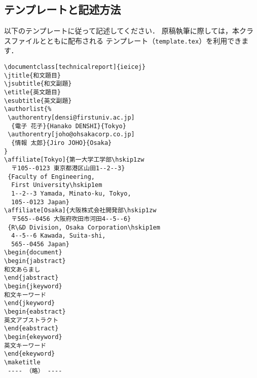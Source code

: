 \documentclass[technicalreport]{ieicej}
\begin{document}
\subsection{テンプレートと記述方法}
\label{sec:technicalreport}

以下のテンプレートに従って記述してください．
原稿執筆に際しては，本クラスファイルとともに配布される
テンプレート（\texttt{template.tex}）を利用できます．

\begin{verbatim}
\documentclass[technicalreport]{ieicej}
\jtitle{和文題目}
\jsubtitle{和文副題}
\etitle{英文題目}
\esubtitle{英文副題}
\authorlist{%
 \authorentry[densi@firstuniv.ac.jp]
  {電子 花子}{Hanako DENSHI}{Tokyo}
 \authorentry[joho@ohsakacorp.co.jp]
  {情報 太郎}{Jiro JOHO}{Osaka}
}
\affiliate[Tokyo]{第一大学工学部\hskip1zw
  〒105--0123 東京都港区山田1--2--3}
 {Faculty of Engineering, 
  First University\hskip1em
  1--2--3 Yamada, Minato-ku, Tokyo,
  105--0123 Japan}
\affiliate[Osaka]{大阪株式会社開発部\hskip1zw
  〒565--0456 大阪府吹田市河田4--5--6}
 {R\&D Division, Osaka Corporation\hskip1em
  4--5--6 Kawada, Suita-shi,
  565--0456 Japan}
\begin{document}
\begin{jabstract}
和文あらまし
\end{jabstract}
\begin{jkeyword}
和文キーワード
\end{jkeyword}
\begin{eabstract}
英文アブストラクト
\end{eabstract}
\begin{ekeyword}
英文キーワード
\end{ekeyword}
\maketitle
 ---- （略） ----
\end{verbatim}
\end{document}
